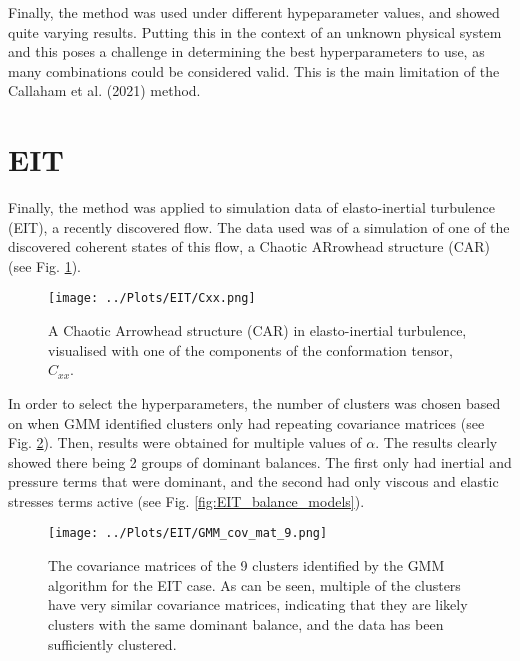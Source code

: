\documentclass[12pt]{report} %
\begin{document}
Finally, the method was used under different hypeparameter values, and showed quite varying results. Putting this in the context of an unknown physical system and this poses a challenge in determining the best hyperparameters to use, as many combinations could be considered valid. This is the main limitation of the Callaham et al. (2021) method.


\section{EIT}

Finally, the method was applied to simulation data of elasto-inertial turbulence (EIT), a recently discovered flow\cite{Samanta2012eit}. The data used was of a simulation of one of the discovered coherent states of this flow\cite{beneitez2024multistability}, a Chaotic ARrowhead structure (CAR) (see Fig. \ref{fig:CAR}).

\begin{figure}[h]
  \centering
  \texttt{[image: ../Plots/EIT/Cxx.png]}
  \caption{A Chaotic Arrowhead structure (CAR) in elasto-inertial turbulence, visualised with one of the components of the conformation tensor, $C_{xx}$.}
  \label{fig:CAR}
\end{figure}

In order to select the hyperparameters, the number of clusters was chosen based on when GMM identified clusters only had repeating covariance matrices (see Fig. \ref{fig:Cov_Mat_EIT}). Then, results were obtained for multiple values of $\alpha$. The results clearly showed there being 2 groups of dominant balances. The first only had inertial and pressure terms that were dominant, and the second had only viscous and elastic stresses terms active (see Fig. \ref{fig:EIT_balance_models}).

\begin{figure}[h]
  \centering
  \texttt{[image: ../Plots/EIT/GMM\_cov\_mat\_9.png]}
  \caption{The covariance matrices of the 9 clusters identified by the GMM algorithm for the EIT case. As can be seen, multiple of the clusters have very similar covariance matrices, indicating that they are likely clusters with the same dominant balance, and the data has been sufficiently clustered.}
  \label{fig:Cov_Mat_EIT}
\end{figure}
\end{document}
